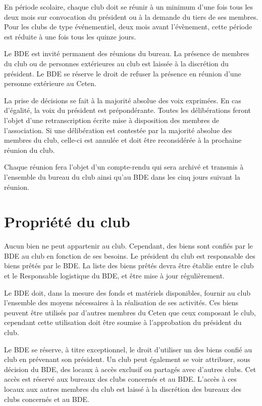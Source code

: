 \documentclass{article}
\begin{document}
\begin{multicols}{2}
		{\small
		
			En période scolaire, chaque club doit se réunir à un minimum d’une
			fois tous les deux mois sur convocation du président ou à la demande
			du tiers de ses membres. Pour les clubs de type événementiel, deux
			mois avant l’évènement, cette période est réduite à une fois tous
			les quinze jours.

			Le BDE est invité permanent des réunions du bureau. La présence de
			membres du club ou de personnes extérieures au club est laissée à la
			discrétion du président. Le BDE se réserve le droit de refuser la
			présence en réunion d'une personne extérieure au Ceten.

			La prise de décisions se fait à la majorité absolue des voix
			exprimées. En cas d’égalité, la voix du président est prépondérante.
			Toutes les délibérations feront l’objet d’une retranscription écrite
			mise à disposition des membres de l’association. Si une délibération
			est contestée par la majorité absolue des membres du club, celle-ci
			est annulée et doit être reconsidérée à la prochaine réunion du
			club.

			Chaque réunion fera l’objet d’un compte-rendu qui sera archivé et
			transmis à l'ensemble du bureau du club ainsi qu'au BDE dans les
			cinq jours suivant la réunion.
			
		}

		\section{Propriété du club}
\label{sec:propriete}
		
		{\small
		
			Aucun bien ne peut appartenir au club. Cependant, des biens sont
			confiés par le BDE au club en fonction de ses besoins. Le président
			du club est responsable des biens prêtés par le BDE\@. La liste des
			biens prêtés devra être établie entre le club et le Responsable
			logistique du BDE, et être mise à jour régulièrement.

			Le BDE doit, dans la mesure des fonds et matériels disponibles,
			fournir au club l’ensemble des moyens nécessaires à la réalisation
			de ses activités. Ces biens peuvent être utilisés par d’autres
			membres du Ceten que ceux composant le club, cependant cette
			utilisation doit être soumise à l’approbation du président du club.

			Le BDE se réserve, à titre exceptionnel, le droit d’utiliser un des
			biens confié au club en prévenant son président. Un club peut
			également se voir attribuer, sous décision du BDE, des locaux à
			accès exclusif ou partagés avec d’autres clubs. Cet accès est
			réservé aux bureaux des clubs concernés et au BDE\@. L’accès à ces
			locaux aux autres membres du club est laissé à la discrétion des
			bureaux des clubs concernés et au BDE\@.
			
}
\end{multicols}
\end{document}
